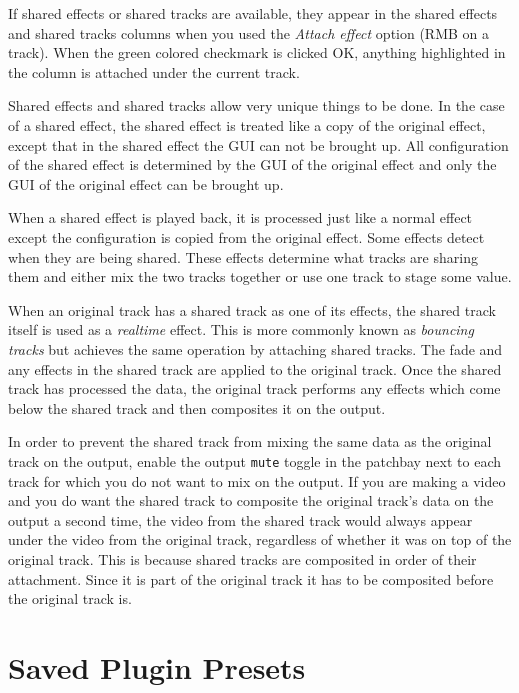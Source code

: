 If shared effects or shared tracks are available, they appear in the shared effects and shared tracks columns when you used the \textit{Attach effect} option (RMB on a track). When the green colored checkmark is clicked OK, anything highlighted in the column is attached under the current track.

Shared effects and shared tracks allow very unique things to be done. In the case of a shared effect, the shared effect is treated like a copy of the original effect, except that in the shared effect the GUI can not be brought up. All configuration of the shared effect is determined by the GUI of the original effect and only the GUI of the original effect can be brought up.

When a shared effect is played back, it is processed just like a normal effect except the configuration is copied from the original effect. Some effects detect when they are being shared. These effects determine what tracks are sharing them and either mix the two tracks together or use one track to stage some value.

When an original track has a shared track as one of its effects, the shared track itself is used as a \textit{realtime} effect. This is more commonly known as \textit{bouncing tracks} but \CGG{} achieves the same operation by attaching shared tracks. The fade and any effects in the shared track are applied to the original track. Once the shared track has processed the data, the original track performs any effects which come below the shared track and then composites it on the output.

In order to prevent the shared track from mixing the same data as the original track on the output, enable the output \texttt{mute} toggle in the patchbay next to each track for which you do not want to mix on the output. If you are making a video and you do want the shared track to composite the original track's data on the output a second time, the video from the shared track would always appear under the video from the original track, regardless of whether it was on top of the original track. This is because shared tracks are composited in order of their attachment. Since it is part of the original track it has to be composited before the original track is.

\section{Saved Plugin Presets}%
\label{sec:saved_plugin_preset}

